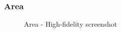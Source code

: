 \documentclass[11pt, letterpaper]{article}
\begin{document}
\subsubsection*{Area}
\begin{figure}[H]
    \centering
    \setlength{\fboxsep}{0pt}
    \caption{Area - High-fidelity screenshot}
    \label{fig:PageScreenshot_Area}
\end{figure}
\end{document}
